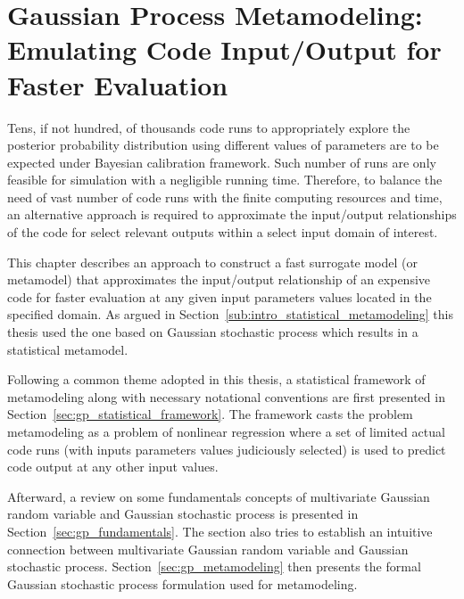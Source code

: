 \chapter[Gaussian Process Metamodeling]{Gaussian Process Metamodeling: Emulating Code Input/Output for Faster Evaluation}\label{ch:gp_metamodel}

Tens, if not hundred, of thousands code runs to appropriately explore the posterior probability distribution using different values of parameters are to be expected under Bayesian calibration framework.
Such number of runs are only feasible for simulation with a negligible running time.
Therefore, to balance the need of vast number of code runs with the finite computing resources and time, 
an alternative approach is required to approximate the input/output relationships of the code for select relevant outputs within a select input domain of interest. 

This chapter describes an approach to construct a fast surrogate model (or metamodel) that approximates the input/output relationship of an expensive code for faster evaluation at any given input parameters values located in the specified domain.
As argued in Section~\ref{sub:intro_statistical_metamodeling} this thesis used the one based on Gaussian stochastic process which results in a statistical metamodel. 

Following a common theme adopted in this thesis, a statistical framework of metamodeling along with necessary notational conventions are first presented in Section~\ref{sec:gp_statistical_framework}.
The framework casts the problem metamodeling as a problem of nonlinear regression where a set of limited actual code runs (with inputs parameters values judiciously selected) is used to predict code output at any other input values.

Afterward, a review on some fundamentals concepts of multivariate Gaussian random variable and Gaussian stochastic process is presented in Section~\ref{sec:gp_fundamentals}.
The section also tries to establish an intuitive connection between multivariate Gaussian random variable and Gaussian stochastic process.
Section~\ref{sec:gp_metamodeling} then presents the formal Gaussian stochastic process formulation used for metamodeling.

